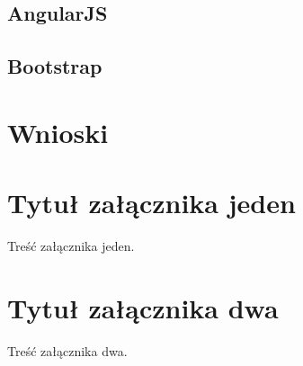 \documentclass[brudnopis]{xmgr}
\begin{document}
\section{AngularJS}

\section{Bootstrap}

\chapter{Wnioski}

\summary

\appendix
\chapter{Tytuł załącznika jeden}

Treść załącznika jeden.
\chapter{Tytuł załącznika dwa}

Treść załącznika dwa.




\nocite {magiaUI}
\nocite {design}
\nocite {projektowanieUI}
\nocite {StiveKrug}
\nocite {UIRails}
\nocite {rails4angular}
\nocite {modelingUI}
\nocite {angularDoc}
\nocite {mongoDoc}
\nocite {rspecDoc}
\nocite {railsDoc}

\listoftables

\listoffigures

\oswiadczenie
\end{document}

